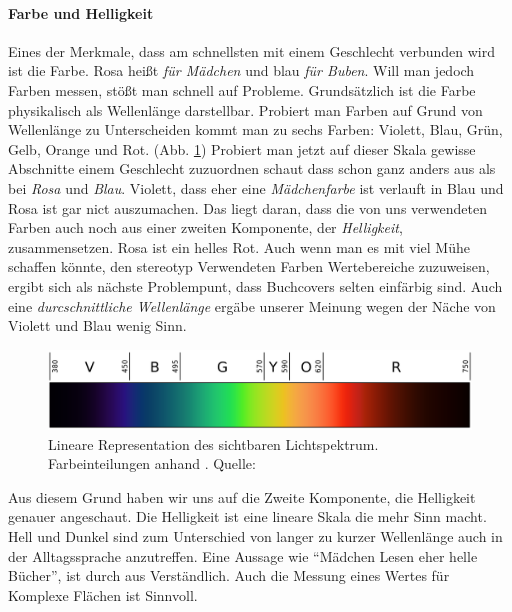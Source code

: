 \paragraph{Farbe und Helligkeit}

Eines der Merkmale, dass am schnellsten mit einem Geschlecht verbunden
wird ist die Farbe. Rosa heißt \emph{für Mädchen} und blau \emph{für
Buben}. Will man jedoch Farben messen, stößt man schnell auf Probleme.
Grundsätzlich ist die Farbe physikalisch als Wellenlänge darstellbar.
Probiert man Farben auf Grund von Wellenlänge zu Unterscheiden kommt man
zu sechs Farben: Violett, Blau, Grün, Gelb, Orange und Rot. (Abb.
\ref{spectrum}) Probiert man jetzt auf dieser Skala gewisse Abschnitte
einem Geschlecht zuzuordnen schaut dass schon ganz anders aus als bei
\emph{Rosa} und \emph{Blau}. Violett, dass eher eine \emph{Mädchenfarbe}
ist verlauft in Blau und Rosa ist gar nict auszumachen. Das liegt daran,
dass die von uns verwendeten Farben auch noch aus einer zweiten
Komponente, der \emph{Helligkeit}, zusammensetzen. Rosa ist ein helles
Rot. Auch wenn man es mit viel Mühe schaffen könnte, den stereotyp
Verwendeten Farben Wertebereiche zuzuweisen, ergibt sich als nächste
Problempunt, dass Buchcovers selten einfärbig sind. Auch eine
\emph{durcschnittliche Wellenlänge} ergäbe unserer Meinung wegen der
Näche von \zB Violett und Blau wenig Sinn.

\begin{figure}
\center
\includegraphics{grafiken/spectrum.png}
  \caption[Sichtbares Lichtspektrum]{Lineare Representation des sichtbaren Lichtspektrum. Farbeinteilungen anhand \cite[3]{Bruno2006}. Quelle: \cite[][\href{http://en.wikipe/wiki/File:Linear_visible_spectrum.svg}{\texttt{/wiki/File:Linear\_visible\_spectrum.svg}}]{en.wiki}}
  \label{spectrum}
\end{figure}

Aus diesem Grund haben wir uns auf die Zweite Komponente, die Helligkeit
genauer angeschaut. Die Helligkeit ist eine lineare Skala die mehr Sinn
macht. Hell und Dunkel sind zum Unterschied von langer zu kurzer
Wellenlänge auch in der Alltagssprache anzutreffen. Eine Aussage wie
\enquote{Mädchen Lesen eher helle Bücher}, ist durch aus Verständlich.
Auch die Messung eines Wertes für Komplexe Flächen ist Sinnvoll.

